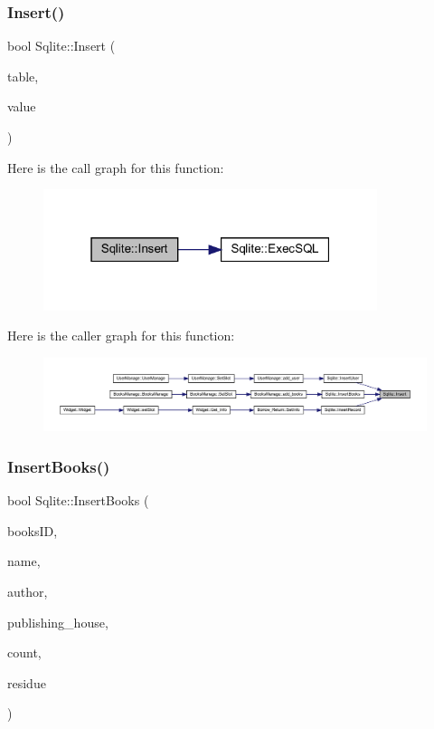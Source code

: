\subsubsection{\texorpdfstring{Insert()}{Insert()}}
{\footnotesize\ttfamily bool Sqlite\+::\+Insert (\begin{DoxyParamCaption}\item[{Q\+String}]{table,  }\item[{Q\+String}]{value }\end{DoxyParamCaption})}

Here is the call graph for this function\+:
\nopagebreak
\begin{figure}[H]
\begin{center}
\leavevmode
\includegraphics[width=277pt]{class_sqlite_a8d0c32df6db2b0ca13695cfa8780840e_cgraph}
\end{center}
\end{figure}
Here is the caller graph for this function\+:
\nopagebreak
\begin{figure}[H]
\begin{center}
\leavevmode
\includegraphics[width=350pt]{class_sqlite_a8d0c32df6db2b0ca13695cfa8780840e_icgraph}
\end{center}
\end{figure}
\mbox{\label{class_sqlite_a246c39ac5e6db51d8bf2fa60e2740d37}} 
\subsubsection{\texorpdfstring{InsertBooks()}{InsertBooks()}}
{\footnotesize\ttfamily bool Sqlite\+::\+Insert\+Books (\begin{DoxyParamCaption}\item[{Q\+String}]{books\+ID,  }\item[{Q\+String}]{name,  }\item[{Q\+String}]{author,  }\item[{Q\+String}]{publishing\+\_\+house,  }\item[{int}]{count,  }\item[{int}]{residue }\end{DoxyParamCaption})}

